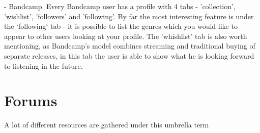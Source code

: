 - Bandcamp.
Every Bandcamp user has a profile with 4 tabs - 'collection', 'wishlist', 'followers' and 'following'.
By far the most interesting feature is under the `following` tab - it is possible to list the genres
which you would like to appear to other users looking at your profile. The 'whishlist' tab is also worth mentioning,
as Bandcamp's model combines streaming and traditional buying of separate releases, in this tab the user is able to
show what he is looking forward to listening in the future.

\section{Forums}
A lot of different resources are gathered under this umbrella term